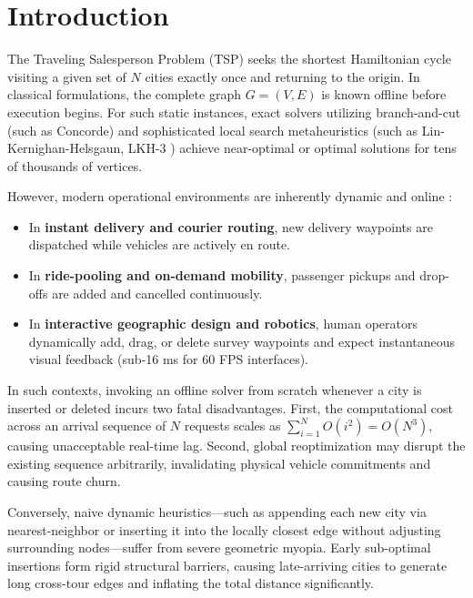 \documentclass[11pt,a4paper]{article}
\theoremstyle{definition}
\begin{document}
\section{Introduction}

The Traveling Salesperson Problem (TSP) seeks the shortest Hamiltonian cycle visiting a given set of $N$ cities exactly once and returning to the origin. In classical formulations, the complete graph $G=(V, E)$ is known offline before execution begins. For such static instances, exact solvers utilizing branch-and-cut (such as Concorde) and sophisticated local search metaheuristics (such as Lin-Kernighan-Helsgaun, LKH-3 \cite{helsgaun2000effective, helsgaun2017extension}) achieve near-optimal or optimal solutions for tens of thousands of vertices.

However, modern operational environments are inherently dynamic and online \cite{psaraftis1988dynamic, jaillet2008online}:
\begin{itemize}
    \item In \textbf{instant delivery and courier routing}, new delivery waypoints are dispatched while vehicles are actively en route.
    \item In \textbf{ride-pooling and on-demand mobility}, passenger pickups and drop-offs are added and cancelled continuously.
    \item In \textbf{interactive geographic design and robotics}, human operators dynamically add, drag, or delete survey waypoints and expect instantaneous visual feedback (sub-16 ms for 60 FPS interfaces).
\end{itemize}

In such contexts, invoking an offline solver from scratch whenever a city is inserted or deleted incurs two fatal disadvantages. First, the computational cost across an arrival sequence of $N$ requests scales as $\sum_{i=1}^N O(i^2) = O(N^3)$, causing unacceptable real-time lag. Second, global reoptimization may disrupt the existing sequence arbitrarily, invalidating physical vehicle commitments and causing route churn.

Conversely, naive dynamic heuristics---such as appending each new city via nearest-neighbor or inserting it into the locally closest edge without adjusting surrounding nodes---suffer from severe geometric myopia. Early sub-optimal insertions form rigid structural barriers, causing late-arriving cities to generate long cross-tour edges and inflating the total distance significantly.
\end{document}
